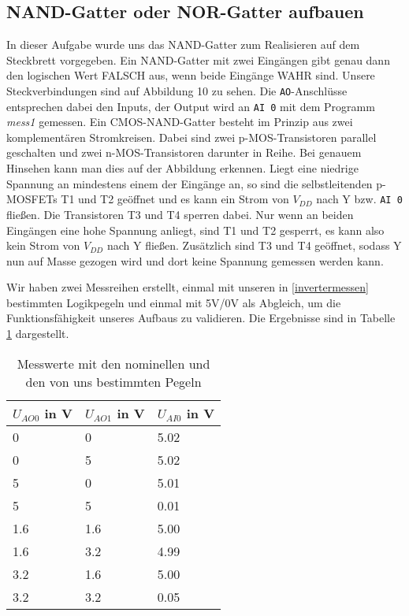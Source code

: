 \documentclass[12pt,a4paper]{scrartcl}
\begin{document}
\subsection{NAND-Gatter oder NOR-Gatter aufbauen}
In dieser Aufgabe wurde uns das NAND-Gatter zum Realisieren auf dem Steckbrett vorgegeben.
Ein NAND-Gatter mit zwei Eing\"angen gibt genau dann den logischen Wert FALSCH aus, wenn beide Eing\"ange WAHR sind.
Unsere Steckverbindungen sind auf Abbildung 10 zu sehen.
Die \texttt{AO}-Anschl\"usse entsprechen dabei den Inputs, der Output wird an \texttt{AI 0} mit dem Programm \emph{mess1} gemessen.
Ein CMOS-NAND-Gatter besteht im Prinzip aus zwei komplement\"aren Stromkreisen.
Dabei sind zwei p-MOS-Transistoren parallel geschalten und zwei n-MOS-Transistoren darunter in Reihe.
Bei genauem Hinsehen kann man dies auf der Abbildung erkennen.
Liegt eine niedrige Spannung an mindestens einem der Eing\"ange an, so sind die selbstleitenden p-MOSFETs T1 und T2 ge\"offnet und es kann ein Strom von $V_{DD}$ nach Y bzw. \texttt{AI 0} flie\ss en.
Die Transistoren T3 und T4 sperren dabei.
Nur wenn an beiden Eing\"angen eine hohe Spannung anliegt, sind T1 und T2 gesperrt, es kann also kein Strom von $V_{DD}$ nach Y flie\ss en.
Zus\"atzlich sind T3 und T4 ge\"offnet, sodass Y nun auf Masse gezogen wird und dort keine Spannung gemessen werden kann.

Wir haben zwei Messreihen erstellt, einmal mit unseren in \ref{invertermessen} bestimmten Logikpegeln und einmal mit 5V/0V als Abgleich, um die Funktionsf\"ahigkeit unseres Aufbaus zu validieren.
Die Ergebnisse sind in Tabelle \ref{tab:nand} dargestellt.

\begin{table}[h]
    \centering
    \begin{tabular}{l|l|l}
    \hline
    $U_{AO 0}$ in V & $U_{AO 1}$ in V   & $U_{AI 0}$ in V  \\
    \hline
    0               & 0                 & 5.02        \\
    0               & 5                 & 5.02        \\
    5               & 0                 & 5.01        \\
    5               & 5                 & 0.01        \\
    \hline
    1.6             & 1.6               & 5.00        \\
    1.6             & 3.2               & 4.99        \\
    3.2             & 1.6               & 5.00        \\
    3.2             & 3.2               & 0.05        \\
    \hline
    \end{tabular}
    \caption{Messwerte mit den nominellen und den von uns bestimmten Pegeln}
    \label{tab:nand}
\end{table}
\end{document}
